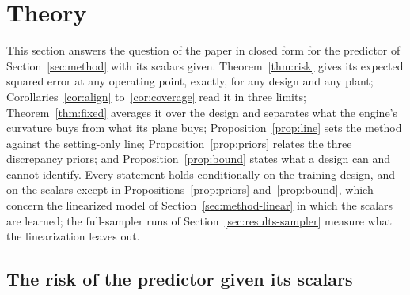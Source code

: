 \section{Theory}\label{sec:theory}

This section answers the question of the paper in closed form for the predictor of Section~\ref{sec:method} with its
scalars given. Theorem~\ref{thm:risk} gives its expected squared error at any operating point, exactly, for any design and
any plant; Corollaries~\ref{cor:align} to~\ref{cor:coverage} read it in three limits; Theorem~\ref{thm:fixed} averages it over
the design and separates what the engine's curvature buys from what its plane buys; Proposition~\ref{prop:line} sets the
method against the setting-only line; Proposition~\ref{prop:priors} relates the three discrepancy priors; and
Proposition~\ref{prop:bound} states what a design can and cannot identify. Every statement holds conditionally on the
training design, and on the scalars except in Propositions~\ref{prop:priors} and~\ref{prop:bound}, which concern the
linearized model of Section~\ref{sec:method-linear} in which the scalars are learned; the full-sampler runs of
Section~\ref{sec:results-sampler} measure what the linearization leaves out.

\subsection{The risk of the predictor given its scalars}

